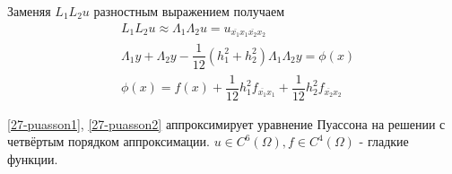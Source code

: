 Заменяя $L_1L_2u$ разностным выражением получаем
\begin{align}
  &L_1L_2u \approx \Lambda_1\Lambda_2 u = u_{\overline{x_1}x_1\overline{x_2}x_2}\\
  \label{27-puasson1}
  &\Lambda_1y + \Lambda_2y - \dfrac{1}{12}(h_1^2 + h_2^2)\Lambda_1\Lambda_2y = \phi(x)\\
  \label{27-puasson2}
  &\phi(x) = f(x) + \dfrac{1}{12}h_1^2f_{\overline{x_1}x_1} + \dfrac{1}{12}h_2^2
  f_{\overline{x_2}x_2}
\end{align}

\eqref{27-puasson1}, \eqref{27-puasson2} аппроксимирует уравнение Пуассона на решении
с четвёртым порядком аппроксимации. ${u \in C^6(\Omega), f \in C^4(\Omega)}$ - гладкие
функции.
